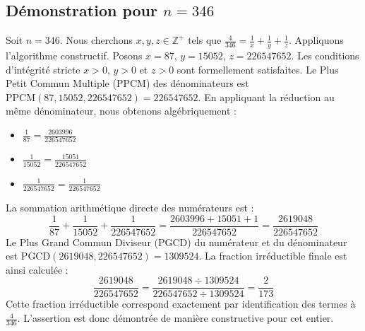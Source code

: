 \documentclass[11pt,a4paper]{article}
\begin{document}
\subsection{Démonstration pour $n = 346$}
Soit $n = 346$. Nous cherchons $x, y, z \in \mathbb{Z}^{+}$ tels que $\frac{4}{346} = \frac{1}{x} + \frac{1}{y} + \frac{1}{z}$.
Appliquons l'algorithme constructif. Posons $x = 87$, $y = 15052$, $z = 226547652$.
Les conditions d'intégrité stricte $x > 0$, $y > 0$ et $z > 0$ sont formellement satisfaites.
Le Plus Petit Commun Multiple (PPCM) des dénominateurs est $\text{PPCM}(87, 15052, 226547652) = 226547652$.
En appliquant la réduction au même dénominateur, nous obtenons algébriquement :
\begin{itemize}
    \item $\frac{1}{87} = \frac{2603996}{226547652}$
    \item $\frac{1}{15052} = \frac{15051}{226547652}$
    \item $\frac{1}{226547652} = \frac{1}{226547652}$
\end{itemize}
La sommation arithmétique directe des numérateurs est :
$$ \frac{1}{87} + \frac{1}{15052} + \frac{1}{226547652} = \frac{2603996 + 15051 + 1}{226547652} = \frac{2619048}{226547652} $$
Le Plus Grand Commun Diviseur (PGCD) du numérateur et du dénominateur est $\text{PGCD}(2619048, 226547652) = 1309524$.
La fraction irréductible finale est ainsi calculée :
$$ \frac{2619048}{226547652} = \frac{2619048 \div 1309524}{226547652 \div 1309524} = \frac{2}{173} $$
Cette fraction irréductible correspond exactement par identification des termes à $\frac{4}{346}$. L'assertion est donc démontrée de manière constructive pour cet entier.
\end{document}
